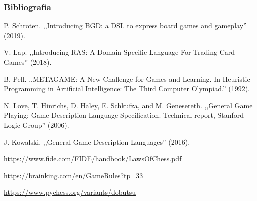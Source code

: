 \documentclass{beamer}
\begin{document}
\begin{frame}[allowframebreaks]
	\frametitle{Bibliografia}
	
	\begin{thebibliography}{9}
		 P. Schroten. ,,Introducing BGD: a DSL to express board games and gameplay'' (2019).

		 V. Lap. ,,Introducing RAS: A Domain Specific Language For Trading Card Games'' (2018).

		  B. Pell. ,,METAGAME: A New Challenge for Games and Learning. In Heuristic Programming in Artificial Intelligence: The Third Computer Olympiad.'' (1992).

		  N. Love, T. Hinrichs, D. Haley, E. Schkufza, and M. Genesereth. ,,General Game Playing: Game Description Language Specification. Technical report, Stanford Logic Group'' (2006).

		 J. Kowalski. ,,General Game Description Languages'' (2016).

		 \url{https://www.fide.com/FIDE/handbook/LawsOfChess.pdf}

		 \url{https://brainking.com/en/GameRules?tp=33}

		 \url{https://www.pychess.org/variants/dobutsu}
	\end{thebibliography}
\end{frame}
\end{document}
